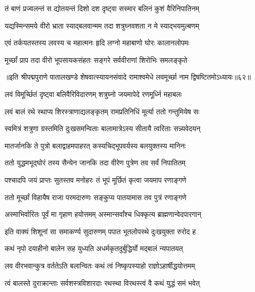\twolineshloka
{तं बाणं प्रज्वलन्तं स द्योतयन्तं दिशो दश}
{दृष्ट्वा सस्मार बलिनं कुशं वैरिनिपातिनम्}%

\twolineshloka
{यद्यस्मिन्समये वीरो भ्राता स्याद्बलवान्मम}
{तदा शत्रुघ्नवशता न मे स्याद्भयमुल्बणम्}%

\twolineshloka
{एवं तर्कयतस्तस्य लवस्य च महात्मनः}
{हृदि लग्नो महाबाणो घोरः कालानलोपमः}%

\twolineshloka
{मूर्च्छां प्राप तदा वीरो भूपसायकसंहतः}
{सङ्गरे सर्ववीराणां शिरोभिः समलङ्कृते}%

{॥इति श्रीपद्मपुराणे पातालखण्डे शेषवात्स्यायनसंवादे रामाश्वमेधे लवमूर्च्छा नाम द्विषष्टितमोऽध्यायः॥६२॥}



\twolineshloka
{लवं विमूर्च्छितं दृष्ट्वा बलिवैरिविदारणम्}
{शत्रुघ्नो जयमापेदे रणमूर्ध्नि महाबलः}%

\twolineshloka
{लवं बालं रथे स्थाप्य शिरस्त्राणाद्यलङ्कृतम्}
{रामप्रतिनिधिं मूर्त्या ततो गन्तुमियेष सः}%

\twolineshloka
{स्वमित्रं शत्रुणा ग्रस्तमिति दुःखसमन्विताः}
{बालामात्रेऽस्य सीतायै त्वरिताः सन्न्यवेदयन्}%


\twolineshloka
{मातर्जानकि ते पुत्रो बलाद्वाहमपाहरत्}
{कस्यचिद्भूपवर्यस्य बलयुक्तस्य मानिनः}%

\twolineshloka
{ततो युद्धमभूद्घोरं तस्य सैन्येन जानकि}
{तदा वीरेण पुत्रेण तव सर्वं निपातितम्}%

\twolineshloka
{पश्चादपि जयं प्राप्तः सुतस्तव मनोहरः}
{तं भूपं मूर्छितं कृत्वा जयमाप रणाङ्गणे}%

\twolineshloka
{ततो मूर्च्छां विहायैष राजा परमदारुणः}
{सङ्कुप्य पातयामास तव पुत्रं रणाङ्गणे}%

\twolineshloka
{अस्माभिर्वारितः पूर्वं मा गृहाण हयोत्तमम्}
{अस्मान्सर्वांश्च धिक्कृत्य ब्राह्मणान्वेदपारगान्}%

\twolineshloka
{इति वाक्यं शिशूनां सा समाकर्ण्य सुदारुणम्}
{पपात भूतलोपस्थे दुःखयुक्ता रुरोद ह}%


\twolineshloka
{कथं नृपो दयाहीनो बालेन सह युध्यति}
{अधर्मकृतदुर्बुद्धिर्यो मद्बालं न्यपातयत्}%

\twolineshloka
{लव वीरभवान्कुत्र वर्ततेऽति बलान्वितः}
{कथं त्वं निष्कृपस्याहो राज्ञोऽहार्षीद्धयोत्तमम्}%

\twolineshloka
{त्वं बालस्ते दुराक्रान्ताः सर्वशस्त्रविशारदाः}
{रथस्था विरथस्त्वं वै कथं युद्धं समं भवेत्}%

